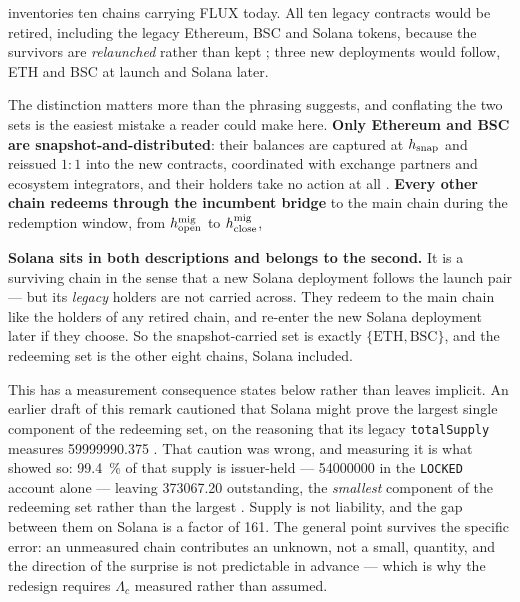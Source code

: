  inventories ten chains carrying FLUX today. All ten legacy contracts
would be retired, including the legacy Ethereum, BSC and Solana tokens, because the survivors are
\emph{relaunched} rather than kept ; three new deployments would
follow, ETH and BSC at launch and Solana later. \planned

\begin{remark}
\label{rem:two-paths}
The distinction matters more than the phrasing suggests, and conflating the two sets is the easiest
mistake a reader could make here. \textbf{Only Ethereum and BSC are snapshot-and-distributed}: their
balances are captured at $h_{\mathrm{snap}}$ and reissued $1{:}1$ into the new contracts, coordinated
with exchange partners and ecosystem integrators, and their holders take no action at all
. \textbf{Every other chain redeems through the
incumbent bridge} to the main chain during the redemption window, from $h^{\mathrm{mig}}_{\mathrm{open}}$ to $h^{\mathrm{mig}}_{\mathrm{close}}$, 

\textbf{Solana sits in both descriptions and belongs to the second.} It is a surviving chain in the
sense that a new Solana deployment follows the launch pair --- but its \emph{legacy} holders are not
carried across. They redeem to the main chain like the holders of any retired chain, and re-enter the
new Solana deployment later if they choose. So the snapshot-carried set is exactly
$\{\mathrm{ETH}, \mathrm{BSC}\}$, and the redeeming set is the other eight chains, Solana included.

This has a measurement consequence  states below rather than leaves
implicit. An earlier draft of this remark cautioned that Solana might prove the largest single
component of the redeeming set, on the reasoning that its legacy \texttt{totalSupply} measures
\num{59999990.375} .
That caution was wrong, and measuring it is what showed so: \SI{99.4}{\percent} of that supply is
issuer-held --- \num{54000000} in the \texttt{LOCKED} account alone --- leaving
\num{373067.20}\flux{} outstanding, the \emph{smallest} component of the redeeming set rather than
the largest . Supply is not liability, and
the gap between them on Solana is a factor of \num{161}. The general point survives the specific
error: an unmeasured chain contributes an unknown, not a small, quantity, and the direction of the
surprise is not predictable in advance --- which is why the redesign requires
$\Lambda_c$ measured rather than assumed.
\end{remark}

